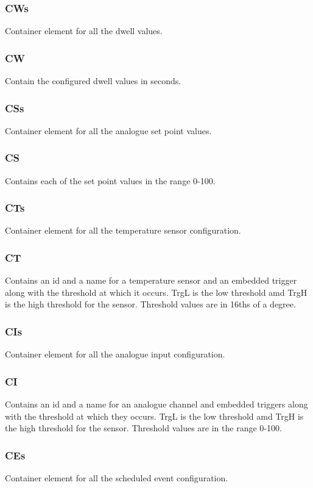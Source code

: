 \subsubsection {CWs}
Container element for all the dwell values.

\subsubsection {CW}
Contain the configured dwell values in seconds.

\subsubsection {CSs}
Container element for all the analogue set point values.

\subsubsection {CS}
Contains each of the set point values in the range 0-100.

\subsubsection {CTs}
Container element for all the temperature sensor configuration.

\subsubsection {CT}
Contains an id and a name for a temperature sensor and an embedded trigger along with the threshold
at which it occurs. TrgL is the low threshold amd TrgH is the high threshold for the sensor. Threshold
values are in 16ths of a degree.

\subsubsection {CIs}
Container element for all the analogue input configuration.

\subsubsection {CI}
Contains an id and a name for an analogue channel and embedded triggers along with the threshold
at which they occurs. TrgL is the low threshold amd TrgH is the high threshold for the sensor. Threshold
values are in the range 0-100.

\subsubsection {CEs}
Container element for all the scheduled event configuration.

